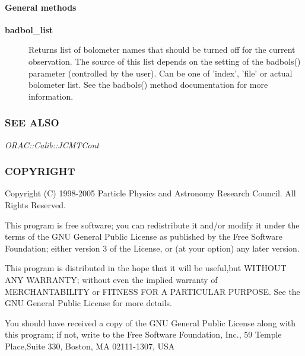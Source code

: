 \paragraph*{General methods\label{ORAC::Calib::SCUBA_General_methods}}
\begin{description}

\item[{\textbf{badbol\_list}}] \mbox{}

Returns list of bolometer names that should be turned off for the
current observation. The source of this list depends on the setting
of the badbols() parameter (controlled by the user).
Can be one of 'index', 'file' or actual bolometer list. See the
badbols() method documentation for more information.

\end{description}
\subsubsection*{SEE ALSO\label{ORAC::Calib::SCUBA_SEE_ALSO}}


\emph{ORAC::Calib::JCMTCont}

\subsubsection*{COPYRIGHT\label{ORAC::Calib::SCUBA_COPYRIGHT}}


Copyright (C) 1998-2005 Particle Physics and Astronomy Research
Council. All Rights Reserved.



This program is free software; you can redistribute it and/or modify it under
the terms of the GNU General Public License as published by the Free Software
Foundation; either version 3 of the License, or (at your option) any later
version.



This program is distributed in the hope that it will be useful,but WITHOUT ANY
WARRANTY; without even the implied warranty of MERCHANTABILITY or FITNESS FOR A
PARTICULAR PURPOSE. See the GNU General Public License for more details.



You should have received a copy of the GNU General Public License along with
this program; if not, write to the Free Software Foundation, Inc., 59 Temple
Place,Suite 330, Boston, MA  02111-1307, USA

